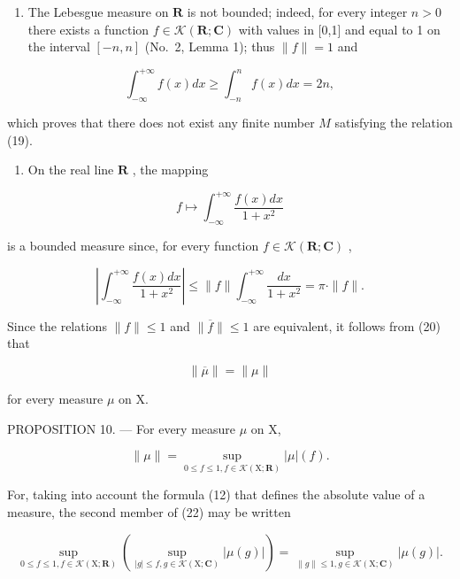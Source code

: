 \begin{enumerate}
\def\labelenumi{\arabic{enumi})}
\setcounter{enumi}{1}
\tightlist
\item
  The Lebesgue measure on \(\mathbf{R}\) is not bounded; indeed, for every integer \(n > 0\) there exists a function \(f \in \mathcal{K}(\mathbf{R}; \mathbf{C})\) with values in {[}0,1{]} and equal to 1 on the interval \([-n, n]\) (No.~2, Lemma 1); thus \(\| f \| = 1\) and
\end{enumerate}

\[
\int_ {- \infty} ^ {+ \infty} f (x) d x \geqslant \int_ {- n} ^ {n} f (x) d x = 2 n,
\]

which proves that there does not exist any finite number \(M\) satisfying the relation (19).

\begin{enumerate}
\def\labelenumi{\arabic{enumi})}
\setcounter{enumi}{2}
\tightlist
\item
  On the real line \(\mathbf{R}\) , the mapping
\end{enumerate}

\[
f \mapsto \int_ {- \infty} ^ {+ \infty} \frac {f (x) d x}{1 + x ^ {2}}
\]

is a bounded measure since, for every function \(f \in \mathcal{K}(\mathbf{R};\mathbf{C})\) ,

\[
\left| \int_ {- \infty} ^ {+ \infty} \frac {f (x) d x}{1 + x ^ {2}} \right| \leqslant \| f \| \int_ {- \infty} ^ {+ \infty} \frac {d x}{1 + x ^ {2}} = \pi \cdot \| f \|.
\]

Since the relations \(\| f\| \leqslant 1\) and \(\| \overline{f}\| \leqslant 1\) are equivalent, it follows from (20) that

\[
\| \overline {{\mu}} \| = \| \mu \|\tag{21}
\]

for every measure \(\mu\) on X.

PROPOSITION 10. --- For every measure \(\mu\) on X,

\[
\| \mu \| = \sup _ {0 \leqslant f \leqslant 1, f \in \mathcal {K} (\mathrm{X}; \mathbf {R})} | \mu | (f).\tag{22}
\]

For, taking into account the formula (12) that defines the absolute value of a measure, the second member of (22) may be written

\[
\sup _ {0 \leqslant f \leqslant 1, f \in \mathcal {K} (\mathrm{X}; \mathbf {R})} \left(\sup _ {| g | \leqslant f, g \in \mathcal {K} (\mathrm{X}; \mathbf {C})} | \mu (g) |\right) = \sup _ {\| g \| \leqslant 1, g \in \mathcal {K} (\mathrm{X}; \mathbf {C})} | \mu (g) |.
\]

